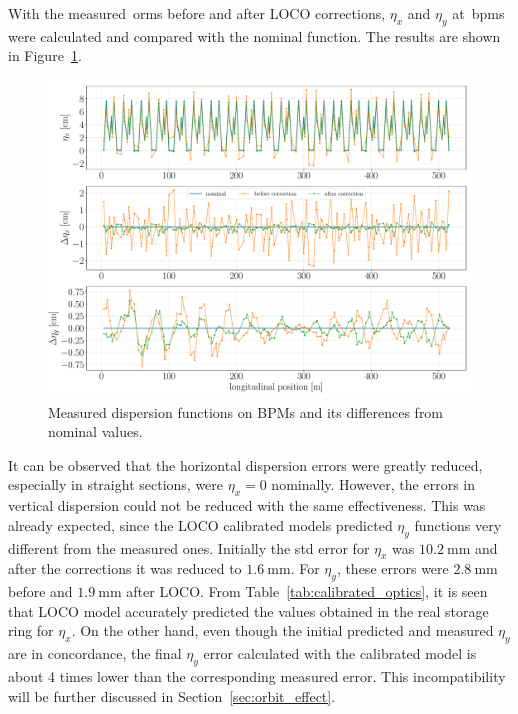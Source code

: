 With the measured~\gls{orm}s before and after LOCO corrections, $\eta_x$ and $\eta_y$ at~\glspl{bpm} were calculated and compared with the nominal function. The results are shown in Figure~\ref{fig:disp_error}. 
\begin{figure}
\centering
\includegraphics[width=1.0\textwidth]{figures/dispersion_after_before_loco_legend.pdf}
\caption{Measured dispersion functions on BPMs and its differences from nominal values.}
\label{fig:disp_error}
\end{figure}

It can be observed that the horizontal dispersion errors were greatly reduced, especially in straight sections, were $\eta_x = 0$ nominally. However, the errors in vertical dispersion could not be reduced with the same effectiveness. This was already expected, since the LOCO calibrated models predicted $\eta_y$ functions very different from the measured ones. Initially the std error for $\eta_x$ was $\SI{10.2}{\milli\meter}$ and after the corrections it was reduced to $\SI{1.6}{\milli\meter}$. For $\eta_y$, these errors were $\SI{2.8}{\milli\meter}$ before and $\SI{1.9}{\milli\meter}$ after LOCO. From Table~\ref{tab:calibrated_optics}, it is seen that LOCO model accurately predicted the values obtained in the real storage ring for $\eta_x$. On the other hand, even though the initial predicted and measured  $\eta_y$ are in concordance, the final $\eta_y$ error calculated with the calibrated model is about 4 times lower than the corresponding measured error. This incompatibility will be further discussed in Section~\ref{sec:orbit_effect}.

